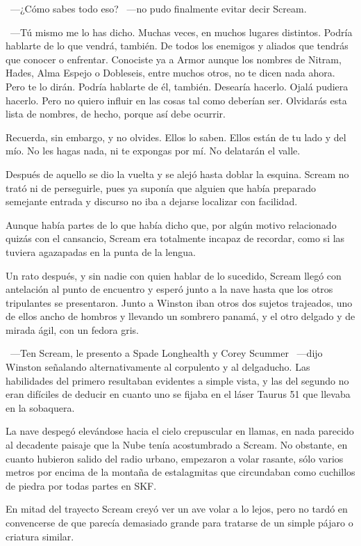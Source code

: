~---¿Cómo sabes todo eso? ~---no pudo finalmente evitar decir Scream.

~---Tú mismo me lo has dicho. Muchas veces, en muchos lugares distintos. Podría hablarte de lo que vendrá, también. De todos los enemigos y aliados que tendrás que conocer o enfrentar. Conociste ya a Armor aunque los nombres de Nitram, Hades, Alma Espejo o Dobleseis, entre muchos otros, no te dicen nada ahora. Pero te lo dirán. Podría hablarte de él, también. Desearía hacerlo. Ojalá pudiera hacerlo. Pero no quiero influir en las cosas tal como deberían ser. Olvidarás esta lista de nombres, de hecho, porque así debe ocurrir.

\rquoti Recuerda, sin embargo, y no olvides. Ellos lo saben. Ellos están de tu lado y del mío. No les hagas nada, ni te expongas por mí. No delatarán el valle.

Después de aquello se dio la vuelta y se alejó hasta doblar la esquina. Scream no trató ni de perseguirle, pues ya suponía que alguien que había preparado semejante entrada y discurso no iba a dejarse localizar con facilidad.

Aunque había partes de lo que había dicho que, por algún motivo relacionado quizás con el cansancio, Scream era totalmente incapaz de recordar, como si las tuviera agazapadas en la punta de la lengua.

\bigskip\noindent
Un rato después, y sin nadie con quien hablar de lo sucedido, Scream llegó con antelación al punto de encuentro y esperó junto a la nave hasta que los otros tripulantes se presentaron. Junto a Winston iban otros dos sujetos trajeados, uno de ellos ancho de hombros y llevando un sombrero panamá, y el otro delgado y de mirada ágil, con un fedora gris.

~---Ten Scream, le presento a Spade Longhealth y Corey Scummer ~---dijo Winston señalando alternativamente al corpulento y al delgaducho. Las habilidades del primero resultaban evidentes a simple vista, y las del segundo no eran difíciles de deducir en cuanto uno se fijaba en el láser Taurus 51 que llevaba en la sobaquera.

La nave despegó elevándose hacia el cielo crepuscular en llamas, en nada parecido al decadente paisaje que la Nube tenía acostumbrado a Scream. No obstante, en cuanto hubieron salido del radio urbano, empezaron a volar rasante, sólo varios metros por encima de la montaña de estalagmitas que circundaban como cuchillos de piedra por todas partes en SKF.

En mitad del trayecto Scream creyó ver un ave volar a lo lejos, pero no tardó en convencerse de que parecía demasiado grande para tratarse de un simple pájaro o criatura similar.

